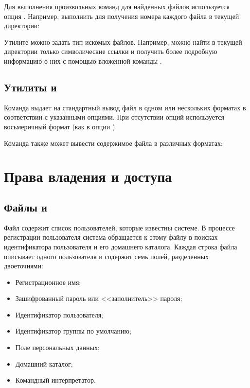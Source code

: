Для выполнения произвольных команд для найденных файлов используется опция . Например, выполнить  для получения номера  каждого файла в текущей директории:


Утилите  можно задать тип искомых файлов. Например, можно найти в текущей директории только символические ссылки и получить более подробную информацию о них с помощью вложенной команды .


\subsection{Утилиты  и }

Команда  выдает на стандартный вывод файл в одном или нескольких форматах в соответствии с указанными опциями. При отсутствии опций используется восьмеричный формат (как в опции ).


Команда  также может вывести содержимое файла в различных форматах:


\section{Права владения и доступа}

\subsection{Файлы  и }

Файл  содержит список пользователей, которые известны системе. В процессе регистрации пользователя система обращается к этому файлу в поисках идентификатора пользователя и его домашнего каталога. Каждая строка файла описывает одного пользователя и  содержит семь полей, разделенных двоеточиями:
\begin{itemize}
	\item Регистрационное имя;
	\item Зашифрованный пароль или <<заполнитель>> пароля;
	\item Идентификатор пользователя;
	\item Идентификатор группы по умолчанию;
	\item Поле персональных данных;
	\item Домашний каталог;
	\item Командный интерпретатор.
\end{itemize}

